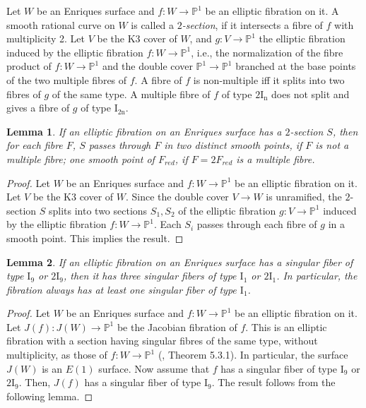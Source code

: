 \documentclass[twoside,11pt]{amsart}
\newtheorem{lemma}{Lemma}[section]
\begin{document}
Let $W$ be an Enriques surface and $f:W\to {{\mathbb P}}^1$ be an elliptic
fibration on it. A smooth rational curve on $W$ is called a {\it
$2$-section}, if it intersects a fibre of $f$ with multiplicity 2.
Let $V$ be the K3 cover of $W$, and $g:V\to {{\mathbb P}}^1$ the elliptic
fibration induced by the elliptic fibration $f: W\to {{\mathbb P}}^1$, i.e.,
the normalization of the fibre product of $f: W\to {{\mathbb P}}^1$ and the
double cover ${{\mathbb P}}^1\to {{\mathbb P}}^1$ branched at the base points of the
two multiple fibres of $f$. A fibre of $f$ is non-multiple iff it
splits into two fibres of $g$ of the same type. A multiple fibre
of $f$ of type $2\mathrm{I_n}$ does not split and gives a fibre of
$g$ of type $\mathrm{I_{2n}}$.

\begin{lemma}\label{bi} If an elliptic fibration on an Enriques surface has a
$2$-section $S$, then for each fibre $F$, $S$ passes through $F$ in
two distinct smooth points, if $F$ is not a multiple fibre; one
smooth point of $F_{red}$, if $F=2F_{red}$ is a multiple fibre.
\end{lemma}

\begin{proof} Let $W$ be an Enriques surface and
$f: W\to {{\mathbb P}}^1$ be an elliptic fibration on it. Let $V$ be the K3
cover of $W$. Since the double cover $V \to W$ is unramified, the
$2$-section $S$ splits into two sections $S_1, S_2$ of the
elliptic fibration $g:V\to {{\mathbb P}}^1$ induced by the elliptic
fibration $f: W\to {{\mathbb P}}^1$. Each $S_i$ passes through each fibre of
$g$ in a smooth point. This implies the result.
\end{proof}

\begin{lemma}\label{Enr-I9} If an elliptic fibration on an Enriques surface has a
singular fiber of  type $\mathrm{I_9}$ or $2\mathrm{I_9}$, then it
has three singular fibers of type $\mathrm{I_1}$ or $2\mathrm{I_1}$.
In particular, the fibration always has at least one singular fiber
of type $\mathrm{I_1}$.
\end{lemma}

\begin{proof} Let $W$ be an Enriques surface and $f:W\to {{\mathbb P}}^1$ be
an elliptic fibration on it. Let $J(f):J(W)\to {{\mathbb P}}^1$ be the
Jacobian fibration of $f$. This is an elliptic fibration with a
section having singular fibres of the same type, without
multiplicity, as those of $f: W\to {{\mathbb P}}^1$ (\cite{CD}, Theorem
5.3.1). In particular, the surface $J(W)$ is an $E(1)$ surface.
Now assume that $f$ has a singular fiber of type $\mathrm{I_9}$ or
$2\mathrm{I_9}$. Then, $J(f)$ has a singular fiber of type
$\mathrm{I_9}$. The result follows from the following lemma.
\end{proof}
\end{document}
